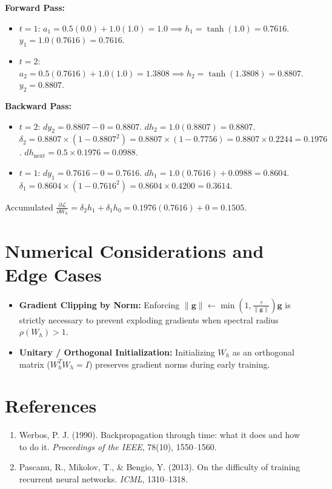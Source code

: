 \documentclass[11pt,a4paper]{article}
\theoremstyle{definition}
\begin{document}
\textbf{Forward Pass:}
\begin{itemize}
    \item $t=1$: $a_1 = 0.5(0.0) + 1.0(1.0) = 1.0 \implies h_1 = \tanh(1.0) = 0.7616$. $y_1 = 1.0(0.7616) = 0.7616$.
    \item $t=2$: $a_2 = 0.5(0.7616) + 1.0(1.0) = 1.3808 \implies h_2 = \tanh(1.3808) = 0.8807$. $y_2 = 0.8807$.
\end{itemize}

\textbf{Backward Pass:}
\begin{itemize}
    \item $t=2$: $dy_2 = 0.8807 - 0 = 0.8807$.
    $dh_2 = 1.0(0.8807) = 0.8807$.
    $\delta_2 = 0.8807 \times (1 - 0.8807^2) = 0.8807 \times (1 - 0.7756) = 0.8807 \times 0.2244 = 0.1976$.
    $dh_{\text{next}} = 0.5 \times 0.1976 = 0.0988$.
    \item $t=1$: $dy_1 = 0.7616 - 0 = 0.7616$.
    $dh_1 = 1.0(0.7616) + 0.0988 = 0.8604$.
    $\delta_1 = 0.8604 \times (1 - 0.7616^2) = 0.8604 \times 0.4200 = 0.3614$.
\end{itemize}

Accumulated $\frac{\partial \mathcal{L}}{\partial W_h} = \delta_2 h_1 + \delta_1 h_0 = 0.1976(0.7616) + 0 = 0.1505$.

\section{Numerical Considerations and Edge Cases}

\begin{itemize}
    \item \textbf{Gradient Clipping by Norm:} Enforcing $\|\mathbf{g}\| \gets \min(1, \frac{\tau}{\|\mathbf{g}\|}) \mathbf{g}$ is strictly necessary to prevent exploding gradients when spectral radius $\rho(W_h) > 1$.
    \item \textbf{Unitary / Orthogonal Initialization:} Initializing $W_h$ as an orthogonal matrix ($W_h^T W_h = I$) preserves gradient norms during early training.
\end{itemize}

\section{References}
\begin{enumerate}
    \item Werbos, P. J. (1990). Backpropagation through time: what it does and how to do it. \emph{Proceedings of the IEEE}, 78(10), 1550--1560.
    \item Pascanu, R., Mikolov, T., & Bengio, Y. (2013). On the difficulty of training recurrent neural networks. \emph{ICML}, 1310--1318.
\end{enumerate}
\end{document}
